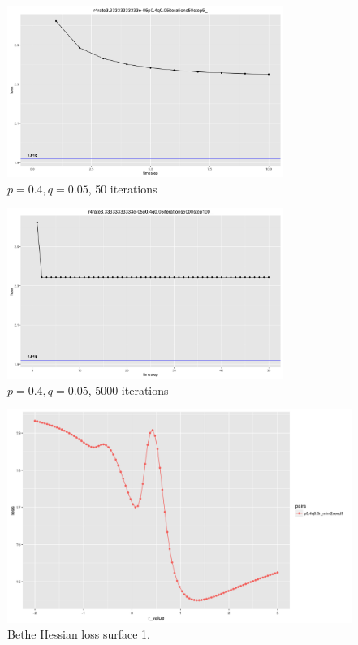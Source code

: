 \begin{figure}
\begin{center}
  \includegraphics[width=0.8\textwidth]{50steps.png}
   \caption{$p=0.4, q=0.05$, 50 iterations}
  \label{fig:GNN_BH}
 \end{center}
\end{figure}

\begin{figure}
\begin{center}
  \includegraphics[width=0.8\textwidth]{500steps.png}
   \caption{$p=0.4, q=0.05$, 5000 iterations}
  \label{fig:GNN_BH_1}
 \end{center}
\end{figure}

\begin{figure}[H]
\begin{center}
\includegraphics[scale=0.4]{loss_surface_1.png}
\caption{Bethe Hessian loss surface 1.}
 \end{center}
\end{figure}

